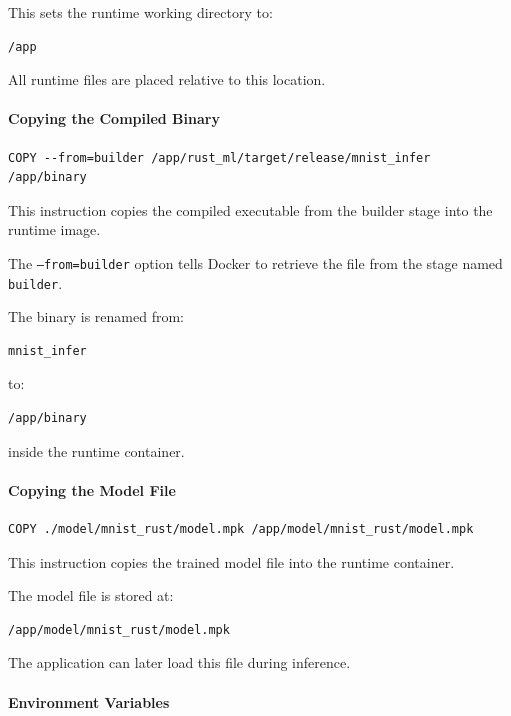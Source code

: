 \documentclass[10pt,a4paper,twocolumn]{article}
\begin{document}
This sets the runtime working directory to:

\begin{verbatim}
/app
\end{verbatim}

All runtime files are placed relative to this location.

\paragraph{Copying the Compiled Binary}

\begin{verbatim}
COPY --from=builder /app/rust_ml/target/release/mnist_infer /app/binary
\end{verbatim}

This instruction copies the compiled executable from the builder stage into the runtime image.

The \texttt{--from=builder} option tells Docker to retrieve the file from the stage named \texttt{builder}.

The binary is renamed from:

\begin{verbatim}
mnist_infer
\end{verbatim}

to:

\begin{verbatim}
/app/binary
\end{verbatim}

inside the runtime container.

\paragraph{Copying the Model File}

\begin{verbatim}
COPY ./model/mnist_rust/model.mpk /app/model/mnist_rust/model.mpk
\end{verbatim}

This instruction copies the trained model file into the runtime container.

The model file is stored at:

\begin{verbatim}
/app/model/mnist_rust/model.mpk
\end{verbatim}

The application can later load this file during inference.

\paragraph{Environment Variables}
\end{document}
